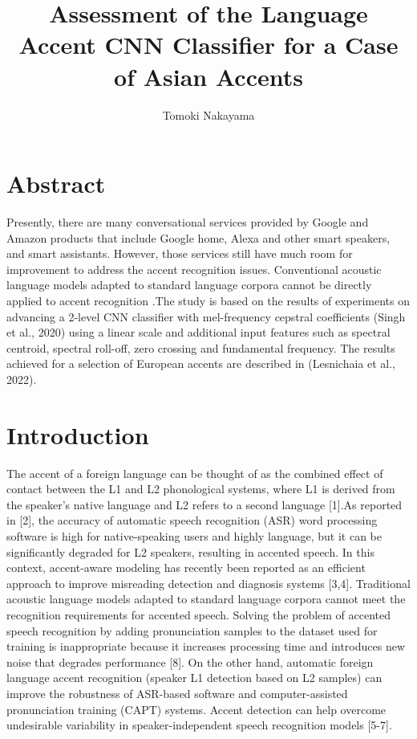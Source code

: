 \documentclass[ams]{U-AizuGT}
\author{Tomoki Nakayama}
\title{Assessment of the Language Accent CNN Classifier for a Case of Asian Accents}
\begin{document}
\maketitle

\section{Abstract}
Presently, there are many conversational services provided by Google and Amazon products that include Google home, Alexa and other smart speakers, and smart assistants. However, those services still have much room for improvement to address the accent recognition issues. Conventional acoustic language models adapted to standard language corpora cannot be directly applied to accent recognition .The study is based on the results of experiments on advancing a 2-level CNN classifier with mel-frequency cepstral coefficients (Singh et al., 2020) using a linear scale and additional input features such as spectral centroid, spectral roll-off, zero crossing and fundamental frequency. The results achieved for a selection of European accents are described in (Lesnichaia et al., 2022). 


\section{Introduction}
The accent of a foreign language can be thought of as the combined effect of contact between the L1 and L2 phonological systems, where L1 is derived from the speaker's native language and L2 refers to a second language [1].As reported in [2], the accuracy of automatic speech recognition (ASR) word processing software is high for native-speaking users and highly language, but it can be significantly degraded for L2 speakers, resulting in accented speech. In this context, accent-aware modeling has recently been reported as an efficient approach to improve misreading detection and diagnosis systems [3,4]. Traditional acoustic language models adapted to standard language corpora cannot meet the recognition requirements for accented speech. Solving the problem of accented speech recognition by adding pronunciation samples to the dataset used for training is inappropriate because it increases processing time and introduces new noise that degrades performance [8]. On the other hand, automatic foreign language accent recognition (speaker L1 detection based on L2 samples) can improve the robustness of ASR-based software and computer-assisted pronunciation training (CAPT) systems. Accent detection can help overcome undesirable variability in speaker-independent speech recognition models [5-7].
\end{document}
